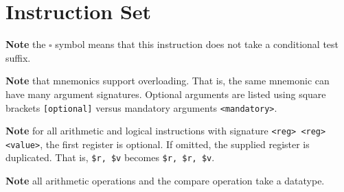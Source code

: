 \documentclass{article}
\begin{document}
\section{Instruction Set}

\textbf{Note} the \(\square\) symbol means that this instruction does not take a conditional test suffix.

\textbf{Note} that mnemonics support overloading.
That is, the same mnemonic can have many argument signatures.
Optional arguments are listed using square brackets \texttt{[optional]} versus mandatory arguments \texttt{<mandatory>}.

\textbf{Note} for all arithmetic and logical instructions with signature \texttt{<reg> <reg> <value>}, the first register is optional.
If omitted, the supplied register is duplicated.
That is, \texttt{\$r, \$v} becomes \texttt{\$r, \$r, \$v}.

\textbf{Note} all arithmetic operations and the compare operation take a datatype.
\end{document}
